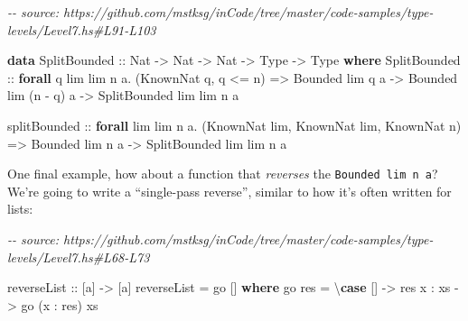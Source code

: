 \documentclass[]{article}
\newenvironment{Shaded}{}{}
\newcommand{\CommentTok}[1]{\textcolor[rgb]{0.38,0.63,0.69}{\textit{#1}}}
\newcommand{\DataTypeTok}[1]{\textcolor[rgb]{0.56,0.13,0.00}{#1}}
\newcommand{\KeywordTok}[1]{\textcolor[rgb]{0.00,0.44,0.13}{\textbf{#1}}}
\newcommand{\NormalTok}[1]{#1}
\newcommand{\OperatorTok}[1]{\textcolor[rgb]{0.40,0.40,0.40}{#1}}
\newcommand{\OtherTok}[1]{\textcolor[rgb]{0.00,0.44,0.13}{#1}}
\begin{document}
\begin{Shaded}
\begin{Highlighting}[]
\CommentTok{{-}{-} source: https://github.com/mstksg/inCode/tree/master/code{-}samples/type{-}levels/Level7.hs\#L91{-}L103}

\KeywordTok{data} \DataTypeTok{SplitBounded}\OtherTok{ ::} \DataTypeTok{Nat} \OtherTok{{-}\textgreater{}} \DataTypeTok{Nat} \OtherTok{{-}\textgreater{}} \DataTypeTok{Nat} \OtherTok{{-}\textgreater{}} \DataTypeTok{Type} \OtherTok{{-}\textgreater{}} \DataTypeTok{Type} \KeywordTok{where}
  \DataTypeTok{SplitBounded} \OtherTok{::}
    \KeywordTok{forall}\NormalTok{ q lim lim\textquotesingle{} n a}\OperatorTok{.}
\NormalTok{    (}\DataTypeTok{KnownNat}\NormalTok{ q, q }\OperatorTok{\textless{}=}\NormalTok{ n) }\OtherTok{=\textgreater{}}
    \DataTypeTok{Bounded}\NormalTok{ lim\textquotesingle{} q a }\OtherTok{{-}\textgreater{}}
    \DataTypeTok{Bounded}\NormalTok{ lim (n }\OperatorTok{{-}}\NormalTok{ q) a }\OtherTok{{-}\textgreater{}}
    \DataTypeTok{SplitBounded}\NormalTok{ lim lim\textquotesingle{} n a}

\OtherTok{splitBounded ::}
  \KeywordTok{forall}\NormalTok{ lim lim\textquotesingle{} n a}\OperatorTok{.}
\NormalTok{  (}\DataTypeTok{KnownNat}\NormalTok{ lim, }\DataTypeTok{KnownNat}\NormalTok{ lim\textquotesingle{}, }\DataTypeTok{KnownNat}\NormalTok{ n) }\OtherTok{=\textgreater{}}
  \DataTypeTok{Bounded}\NormalTok{ lim n a }\OtherTok{{-}\textgreater{}}
  \DataTypeTok{SplitBounded}\NormalTok{ lim lim\textquotesingle{} n a}
\end{Highlighting}
\end{Shaded}

One final example, how about a function that \emph{reverses} the
\texttt{Bounded\ lim\ n\ a}? We're going to write a ``single-pass reverse'',
similar to how it's often written for lists:

\begin{Shaded}
\begin{Highlighting}[]
\CommentTok{{-}{-} source: https://github.com/mstksg/inCode/tree/master/code{-}samples/type{-}levels/Level7.hs\#L68{-}L73}

\OtherTok{reverseList ::}\NormalTok{ [a] }\OtherTok{{-}\textgreater{}}\NormalTok{ [a]}
\NormalTok{reverseList }\OtherTok{=}\NormalTok{ go []}
  \KeywordTok{where}
\NormalTok{    go res }\OtherTok{=}\NormalTok{ \textbackslash{}}\KeywordTok{case}
\NormalTok{      [] }\OtherTok{{-}\textgreater{}}\NormalTok{ res}
\NormalTok{      x }\OperatorTok{:}\NormalTok{ xs }\OtherTok{{-}\textgreater{}}\NormalTok{ go (x }\OperatorTok{:}\NormalTok{ res) xs}
\end{Highlighting}
\end{Shaded}
\end{document}
